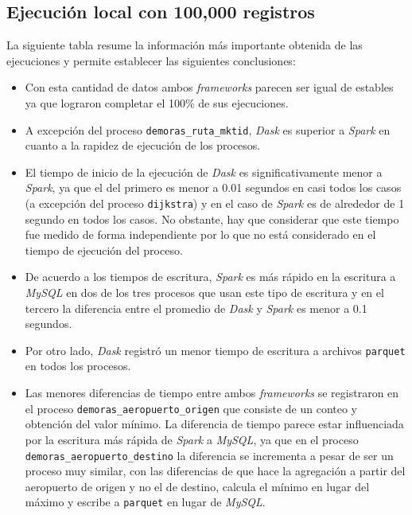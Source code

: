 \subsection{Ejecución local con 100,000 registros}

La siguiente tabla resume la información más importante obtenida de las ejecuciones y permite establecer las siguientes conclusiones:

\begin{itemize}
	\item Con esta cantidad de datos ambos \textit{frameworks} parecen ser igual de estables ya que lograron completar el 100\% de sus ejecuciones.
	
	\item A excepción del proceso \texttt{demoras\_ruta\_mktid}, \textit{Dask} es superior a \textit{Spark} en cuanto a la rapidez de ejecución de los procesos.
	
	\item El tiempo de inicio de la ejecución de \textit{Dask} es significativamente menor a \textit{Spark}, ya que el del primero es menor a 0.01 segundos en casi todos los casos (a excepción del proceso \texttt{dijkstra}) y en el caso de \textit{Spark} es de alrededor de 1 segundo en todos los casos. No obstante, hay que considerar que este tiempo fue medido de forma independiente por lo que no está considerado en el tiempo de ejecución del proceso.
	
	\item De acuerdo a los tiempos de escritura, \textit{Spark} es más rápido en la escritura a \textit{MySQL} en dos de los tres procesos que usan este tipo de escritura y en el tercero la diferencia entre el promedio de \textit{Dask} y \textit{Spark} es menor a 0.1 segundos.
	
	\item Por otro lado, \textit{Dask} registró un menor tiempo de escritura a archivos \texttt{parquet} en todos los procesos.
	
	\item Las menores diferencias de tiempo entre ambos \textit{frameworks} se registraron en el proceso \texttt{demoras\_aeropuerto\_origen} que consiste de un conteo y obtención del valor mínimo. La diferencia de tiempo parece estar influenciada por la escritura más rápida de \textit{Spark} a \textit{MySQL}, ya que en el proceso \texttt{demoras\_aeropuerto\_destino} la diferencia se incrementa a pesar de ser un proceso muy similar, con las diferencias de que hace la agregación a partir del aeropuerto de origen y no el de destino, calcula el mínimo en lugar del máximo y escribe a \texttt{parquet} en lugar de \textit{MySQL}.
	

\end{itemize}
